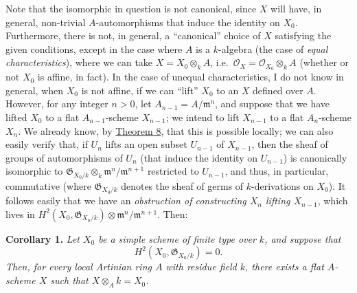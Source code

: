 \documentclass{article}
\newenvironment{itenv}[1]
  {\phantomsection\par\smallskip\noindent\textbf{#1.}\itshape}
  {\par\smallskip}
\newcommand{\oldpage}[1]{\marginpar{\footnotesize$\Big\vert$ \textit{p.~#1}}}
\theoremstyle{definition}
\theoremstyle{definition}
\theoremstyle{definition}
\theoremstyle{definition}
\theoremstyle{remark}
\begin{document}
Note that the isomorphic in question is not canonical, since \(X\) will have, in general, non-trivial \(A\)-automorphisms that induce the identity on \(X_0\).
Furthermore, there is not, in general, a ``canonical'' choice of \(X\) satisfying the given conditions, except in the case where \(A\) is a \(k\)-algebra (the case of \emph{equal characteristics}), where we can take \(X=X_0\otimes_k A\), i.e.~\({\mathscr{O}}_X={\mathscr{O}}_{X_0}\otimes_k A\) (whether or not \(X_0\) is affine, in fact).
In the case of unequal characteristics, I do not know in general, when \(X_0\) is not affine, if we can ``lift'' \(X_0\) to an \(X\) defined over \(A\).
However, for any integer \(n>0\), let \(A_{n-1}=A/{\mathfrak{m}}^n\), and suppose that we have lifted \(X_0\) to a flat \(A_{n-1}\)-scheme \(X_{n-1}\);
we intend to lift \(X_{n-1}\) to a flat \(A_n\)-scheme \(X_n\).
We already know, by \protect\hyperlink{fga-2-theorem-8}{Theorem 8}, that this is possible locally;
we can also easily verify that, if \(U_n\) lifts an open subset \(U_{n-1}\) of \(X_{n-1}\), then the sheaf of groups of automorphisms of \(U_n\) (that induce the identity on \(U_{n-1}\)) is canonically isomorphic to \({\mathfrak{G}}_{X_0/k}\otimes_k{\mathfrak{m}}^n/{\mathfrak{m}}^{n+1}\) restricted to \(U_{n-1}\), and thus, in particular, commutative (where \({\mathfrak{G}}_{X_0/k}\) denotes the sheaf of germs of \(k\)-derivations on \(X_0\)).
It follows easily that we have an \emph{obstruction of constructing \(X_n\) lifting \(X_{n-1}\)}, which lives in \(H^2(X_0,{\mathfrak{G}}_{X_0/k})\otimes{\mathfrak{m}}^n/{\mathfrak{m}}^{n+1}\).
Then:

\leavevmode{}%
\begin{itenv}{Corollary 1}
Let \(X_0\) be a simple scheme of finite type over \(k\), and suppose that
\[H^2(X_0,{\mathfrak{G}}_{X_0/k})=0.\]
\oldpage{182-13}Then, for every local Artinian ring \(A\) with residue field \(k\), there exists a flat \(A\)-scheme \(X\) such that \(X\otimes_A k=X_0\).

\end{itenv}
\end{document}
